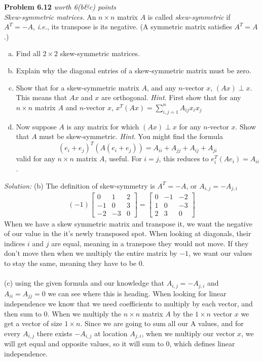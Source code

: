 \documentclass{article}
\newenvironment{problem}[3][Problem]
    { \begin{mdframed}[backgroundcolor=gray!20] \textbf{#1 #2} \textit{worth #3 points} \\}
    {  \end{mdframed}}
\newenvironment{solution}
    {\textit{Solution:}}
    {}
\begin{document}
\begin{problem}{6.12}{6(b\&c)}
\textit{Skew-symmetric matrices}. An $n \times n$ matrix $A$ is called \textit{skew-symmetric} if $A^T = -A$, \textit{i.e.}, its transpose is its negative. (A symmetric matrix satisfies $A^T = A$.)
\begin{enumerate}[(a)]
    \item Find all $2\times 2$ skew-symmetric matrices.
    \item Explain why the diagonal entries of a skew-symmetric matrix must be zero.
    \item Show that for a skew-symmetric matrix $A$, and any $n$-vector $x$, $(Ax) \perp x$. This means that $Ax$ and $x$ are orthogonal. \textit{Hint}. First show that for any $n\times n$ matrix $A$ and $n$-vector $x$, $x^{T}(A x)=\sum_{i, j=1}^{n} A_{i j} x_{i} x_{j}$
    \item Now suppose $A$ is any matrix for which $(Ax) \perp x$ for any $n$-vector $x$. Show that $A$ must be skew-symmetric. \textit{Hint}. You might find the formula
    $$\left(e_{i}+e_{j}\right)^{T}\left(A\left(e_{i}+e_{j}\right)\right)=A_{i i}+A_{j j}+A_{i j}+A_{j i}$$
    valid for any $n\times n$ matrix $A$, useful. For $i = j$, this reduces to $e_i^T(Ae_i)= A_{ii}$.
\end{enumerate}
\end{problem}
\begin{solution}
(b) The definition of skew-symmetry is $A^T = -A$, or $A_{i,j} = -A_{j,i}$
\begin{align*}
    (-1)\begin{bmatrix} 0 &1 &2 \\ -1 &0 &3 \\ -2 &-3 &0 \end{bmatrix} = \begin{bmatrix} 0 &-1 &-2 \\ 1 &0 &-3 \\ 2 &3 &0 \end{bmatrix}
\end{align*}
When we have a skew symmetric matrix and transpose it, we want the negative of our value in the it's newly transposed spot. When looking at diagonals, their indices $i$ and $j$ are equal, meaning in a transpose they would not move. If they don't move then when we multiply the entire matrix by $-1$, we want our values to stay the same, meaning they have to be 0. \\
\\
(c) using the given formula and our knowledge that $A_{i,j} = -A_{j,i}$ and $A_{ii} = A_{jj} = 0$ we can see where this is heading. When looking for linear independence we know that we need coefficients to multiply by each vector, and then sum to 0. When we multiply the $n\times n$ matrix $A$ by the $1\times n$ vector $x$ we get a vector of size $1\times n$. Since we are going to sum all our A values, and for every $A_{i,j}$ there exists $-A_{i,j}$ at location $A_{j,i}$, when we multiply our vector $x$, we will get equal and opposite values, so it will sum to 0, which defines linear independence. 
\end{solution}
\end{document}
